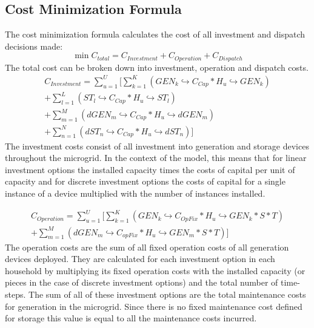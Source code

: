 \documentclass[
	11pt,								%
	DIV10,								%
	a4paper,         					%
	oneside,							%
	headheight=20pt,					%
	footheight=20pt,					%
    parskip=full,						%
    listof=totoc,						%
	bibliography=totoc,					%
	index=totoc,						%
]{scrartcl}
\begin{document}
\subsection{Cost Minimization Formula}
The cost minimization formula calculates the cost of all investment and dispatch decisions made:
\begin{equation}
	\min C_{total} = C_{Investment} + C_{Operation} + C_{Dispatch}
\end{equation}
The total cost can be broken down into investment, operation and dispatch costs. 
\begin{equation}
	\begin{split}
		C_{Investment} = \sum_{u=1}^{U}[\sum_{k=1}^K{(GEN_k\hookrightarrow  C_{Cap} * H_u\hookrightarrow  GEN_k)}\\
		+ \sum_{l=1}^L{(ST_l\hookrightarrow  C_{Cap} * H_u\hookrightarrow  ST_l)}\\
		+ \sum_{m=1}^M{(dGEN_m\hookrightarrow  C_{Cap} * H_u\hookrightarrow  dGEN_m)}\\
		+ \sum_{n=1}^N{(dST_n\hookrightarrow  C_{Cap} * H_u\hookrightarrow  dST_n)}]
	\end{split}
\end{equation}
The investment costs consist of all investment into generation and storage devices throughout the microgrid. In the context of the model, this means that for linear investment options the installed capacity times the costs of capital per unit of capacity and for discrete investment options the costs of capital for a single instance of a device multiplied with the number of instances installed.

\begin{equation}
	\begin{split}
		C_{Operation} = \sum_{u=1}^{U}[\sum_{k=1}^{K}(GEN_k\hookrightarrow  C_{OpFix} * H_u \hookrightarrow GEN_k * S * T)\\
	 	+ \sum_{m=1}^{M}(dGEN_m\hookrightarrow  C_{opFix} * H_u \hookrightarrow GEN_m * S * T)]
	\end{split}
\end{equation}
The operation costs are the sum of all fixed operation costs of all generation devices deployed. They are calculated for each investment option in each household by multiplying its fixed operation costs with the installed capacity (or pieces in the case of discrete investment options) and the total number of time-steps. The sum of all of these investment options are the total maintenance costs for generation in the microgrid. Since there is no fixed maintenance cost defined for storage this value is equal to all the maintenance costs incurred.
\end{document}
